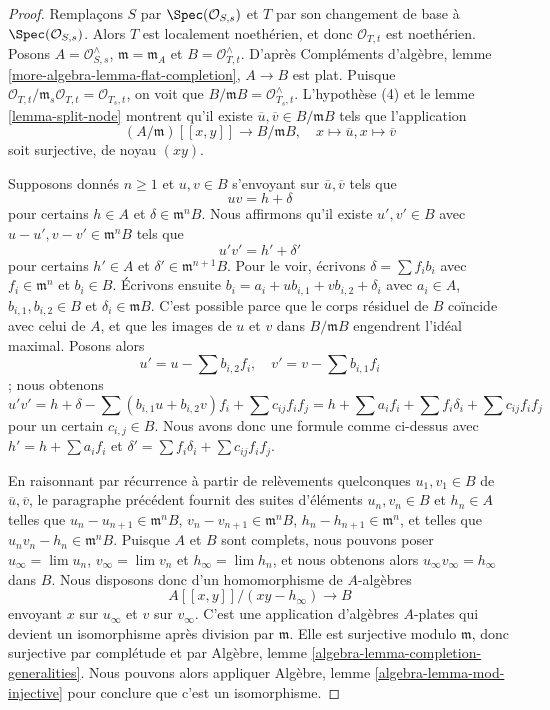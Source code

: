 \begin{proof}
Remplaçons $S$ par $\Spec(\mathcal{O}_{S, s})$ et $T$ par son changement de base à $\Spec(\mathcal{O}_{S, s})$. Alors $T$ est localement noethérien, et donc $\mathcal{O}_{T, t}$ est noethérien. Posons $A = \mathcal{O}_{S, s}^\wedge$, $\mathfrak m = \mathfrak m_A$ et $B = \mathcal{O}_{T, t}^\wedge$. D'après Compléments d'algèbre, lemme \ref{more-algebra-lemma-flat-completion}, $A \to B$ est plat. Puisque $\mathcal{O}_{T, t}/\mathfrak m_s \mathcal{O}_{T, t} = \mathcal{O}_{T_s, t}$, on voit que $B/\mathfrak m B = \mathcal{O}_{T_s, t}^\wedge$. L'hypothèse (4) et le lemme \ref{lemma-split-node} montrent qu'il existe $\overline{u}, \overline{v} \in B/\mathfrak m B$ tels que l'application $$
(A/\mathfrak m)[[x, y]] \longrightarrow B/\mathfrak m B,\quad
x \longmapsto \overline{u},
x \longmapsto \overline{v}
$$ soit surjective, de noyau $(xy)$.

\medskip\noindent
Supposons donnés $n \geq 1$ et $u, v \in B$ s'envoyant sur $\overline{u}, \overline{v}$ tels que $$
u v = h + \delta
$$ pour certains $h \in A$ et $\delta \in \mathfrak m^nB$. Nous affirmons qu'il existe $u', v' \in B$ avec $u - u', v - v' \in \mathfrak m^n B$ tels que $$
u' v' = h' + \delta'
$$ pour certains $h' \in A$ et $\delta' \in \mathfrak m^{n + 1}B$. Pour le voir, écrivons $\delta = \sum f_i b_i$ avec $f_i \in \mathfrak m^n$ et $b_i \in B$. Écrivons ensuite $b_i = a_i + u b_{i, 1} + v b_{i, 2} + \delta_i$ avec $a_i \in A$, $b_{i, 1}, b_{i, 2} \in B$ et $\delta_i \in \mathfrak m B$. C'est possible parce que le corps résiduel de $B$ coïncide avec celui de $A$, et que les images de $u$ et $v$ dans $B/\mathfrak m B$ engendrent l'idéal maximal. Posons alors $$
u' = u - \sum b_{i, 2}f_i,\quad
v' = v - \sum b_{i, 1}f_i
$$; nous obtenons $$
u'v' = h + \delta - \sum (b_{i, 1}u + b_{i, 2}v)f_i + \sum
c_{ij}f_if_j =
h + \sum a_if_i + \sum f_i \delta_i + \sum c_{ij}f_if_j
$$ pour un certain $c_{i, j} \in B$. Nous avons donc une formule comme ci-dessus avec $h' = h + \sum a_if_i$ et $\delta' = \sum f_i \delta_i + \sum c_{ij}f_if_j$.

\medskip\noindent
En raisonnant par récurrence à partir de relèvements quelconques $u_1, v_1 \in B$ de $\overline{u}, \overline{v}$, le paragraphe précédent fournit des suites d'éléments $u_n, v_n \in B$ et $h_n \in A$ telles que $u_n - u_{n + 1} \in \mathfrak m^n B$, $v_n - v_{n + 1} \in \mathfrak m^n B$, $h_n - h_{n + 1} \in \mathfrak m^n$, et telles que $u_n v_n - h_n \in \mathfrak m^n B$. Puisque $A$ et $B$ sont complets, nous pouvons poser $u_\infty = \lim u_n$, $v_\infty = \lim v_n$ et $h_\infty = \lim h_n$, et nous obtenons alors $u_\infty v_\infty = h_\infty$ dans $B$. Nous disposons donc d'un homomorphisme de $A$-algèbres $$
A[[x, y]]/(xy - h_\infty) \longrightarrow B
$$ envoyant $x$ sur $u_\infty$ et $v$ sur $v_\infty$. C'est une application d'algèbres $A$-plates qui devient un isomorphisme après division par $\mathfrak m$. Elle est surjective modulo $\mathfrak m$, donc surjective par complétude et par Algèbre, lemme \ref{algebra-lemma-completion-generalities}. Nous pouvons alors appliquer Algèbre, lemme \ref{algebra-lemma-mod-injective} pour conclure que c'est un isomorphisme.
\end{proof}

